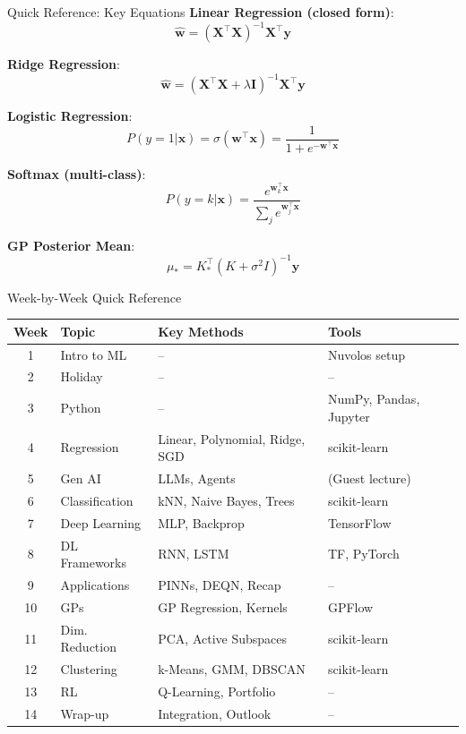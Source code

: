 \documentclass[aspectratio=169,11pt]{beamer}
\newcommand{\x}{\mathbf{x}}
\newcommand{\w}{\mathbf{w}}
\newcommand{\y}{\mathbf{y}}
\newcommand{\X}{\mathbf{X}}
\begin{document}
\begin{frame}{Quick Reference: Key Equations}
\textbf{Linear Regression (closed form)}:
\[\hat{\w} = (\X^\top\X)^{-1}\X^\top\y\]

\textbf{Ridge Regression}:
\[\hat{\w} = (\X^\top\X + \lambda\mathbf{I})^{-1}\X^\top\y\]

\textbf{Logistic Regression}:
\[P(y=1|\x) = \sigma(\w^\top\x) = \frac{1}{1 + e^{-\w^\top\x}}\]

\textbf{Softmax (multi-class)}:
\[P(y=k|\x) = \frac{e^{\w_k^\top\x}}{\sum_j e^{\w_j^\top\x}}\]

\textbf{GP Posterior Mean}:
\[\mu_* = K_*^\top(K + \sigma^2I)^{-1}\y\]
\end{frame}

\begin{frame}{Week-by-Week Quick Reference}
{\small
\begin{tabular}{clll}
\toprule
\textbf{Week} & \textbf{Topic} & \textbf{Key Methods} & \textbf{Tools} \\
\midrule
1 & Intro to ML & -- & Nuvolos setup \\
2 & Holiday & -- & -- \\
3 & Python & -- & NumPy, Pandas, Jupyter \\
4 & Regression & Linear, Polynomial, Ridge, SGD & scikit-learn \\
5 & Gen AI & LLMs, Agents & (Guest lecture) \\
6 & Classification & kNN, Naive Bayes, Trees & scikit-learn \\
7 & Deep Learning & MLP, Backprop & TensorFlow \\
8 & DL Frameworks & RNN, LSTM & TF, PyTorch \\
9 & Applications & PINNs, DEQN, Recap & -- \\
10 & GPs & GP Regression, Kernels & GPFlow \\
11 & Dim. Reduction & PCA, Active Subspaces & scikit-learn \\
12 & Clustering & k-Means, GMM, DBSCAN & scikit-learn \\
13 & RL & Q-Learning, Portfolio & -- \\
14 & Wrap-up & Integration, Outlook & -- \\
\bottomrule
\end{tabular}
}
\end{frame}
\end{document}
